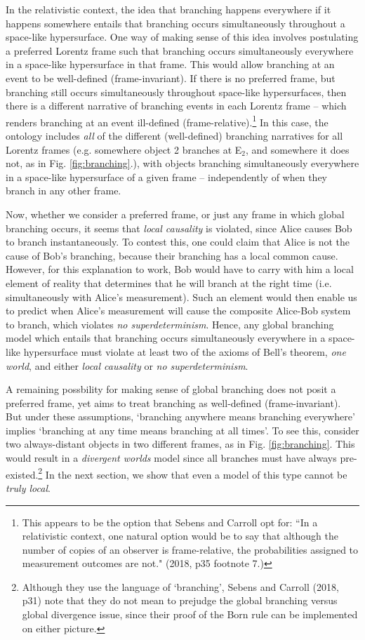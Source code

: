 \documentclass[a4paper]{article}
\begin{document}
In the relativistic context, the idea that branching happens everywhere if it happens somewhere entails that branching occurs simultaneously throughout a space-like hypersurface. One way of making sense of this idea involves postulating a preferred Lorentz frame such that branching occurs simultaneously everywhere in a space-like hypersurface in that frame. This would allow branching at an event to be well-defined (frame-invariant).  If there is no preferred frame, but branching still occurs simultaneously throughout space-like hypersurfaces, then there is a different narrative of branching events in each Lorentz frame -- which renders branching at an event ill-defined (frame-relative).\footnote{This appears to be the option that Sebens and Carroll opt for: ``In a relativistic context, one natural option would be to say that although the number of copies of an observer is frame-relative, the probabilities assigned to measurement outcomes are not." (2018, p35 footnote 7.)} In this case, the ontology includes \textit{all} of the different (well-defined) branching narratives for all Lorentz frames (e.g. somewhere object 2 branches at E$_2$, and somewhere it does not, as in Fig. \ref{fig:branching}.), with objects branching simultaneously everywhere in a space-like hypersurface of a given frame -- independently of when they branch in any other frame.

Now, whether we consider a preferred frame, or just any frame in which global branching occurs, it seems that \textit{local causality} is violated, since Alice causes Bob to branch instantaneously. To contest this, one could claim that Alice is not the cause of Bob's branching, because their branching has a local common cause. However, for this explanation to work, Bob would have to carry with him a local element of reality that determines that he will branch at the right time (i.e. simultaneously with Alice's measurement). Such an element would then enable us to predict when Alice's measurement will cause the composite Alice-Bob system to branch, which violates \textit{no superdeterminism}.  Hence, any global branching model which entails that branching occurs simultaneously everywhere in a space-like hypersurface must violate at least two of the axioms of Bell's theorem, \textit{one world}, and either \textit{local causality} or \textit{no superdeterminism}.

 
A remaining possbility for making sense of global branching does not posit a preferred frame, yet aims to treat branching as well-defined (frame-invariant). But under these assumptions, `branching anywhere means branching everywhere'  implies `branching at any time means branching at all times'. To see this, consider two always-distant objects in two different frames, as in Fig. \ref{fig:branching}. This would result in a \textit{divergent worlds} model since all branches must have always pre-existed.\footnote{Although they use the language of `branching', Sebens and Carroll (2018, p31) note that they do not mean to prejudge the global branching versus global divergence issue, since their proof of the Born rule can be implemented on either picture.} In the next section, we show that even a model of this type cannot be \textit{truly local}.
\end{document}
